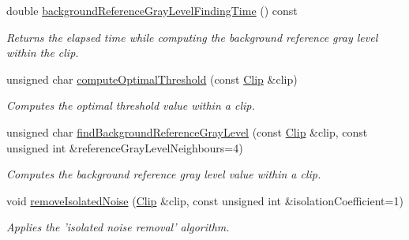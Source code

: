 \begin{CompactItemize}
double \hyperlink{class_preprocessor_3189cad5515476d54cc14effcf983fc7}{backgroundReferenceGrayLevelFindingTime} () const 
\begin{CompactList}\small\item\em Returns the elapsed time while computing the background reference gray level within the clip. \item\end{CompactList}\item 
unsigned char \hyperlink{class_preprocessor_0e146cafa6b8b31f4f4ed189a970db7a}{computeOptimalThreshold} (const \hyperlink{class_clip}{Clip} \&clip)
\begin{CompactList}\small\item\em Computes the optimal threshold value within a clip. \item\end{CompactList}\item 
unsigned char \hyperlink{class_preprocessor_19aa90451cf6f99854833c05d3e71270}{findBackgroundReferenceGrayLevel} (const \hyperlink{class_clip}{Clip} \&clip, const unsigned int \&referenceGrayLevelNeighbours=4)
\begin{CompactList}\small\item\em Computes the background reference gray level value within a clip. \item\end{CompactList}\item 
void \hyperlink{class_preprocessor_a365f69af48cae608071e9943f300dd5}{removeIsolatedNoise} (\hyperlink{class_clip}{Clip} \&clip, const unsigned int \&isolationCoefficient=1)
\begin{CompactList}\small\item\em Applies the 'isolated noise removal' algorithm. \item\end{CompactList}\end{CompactItemize}
